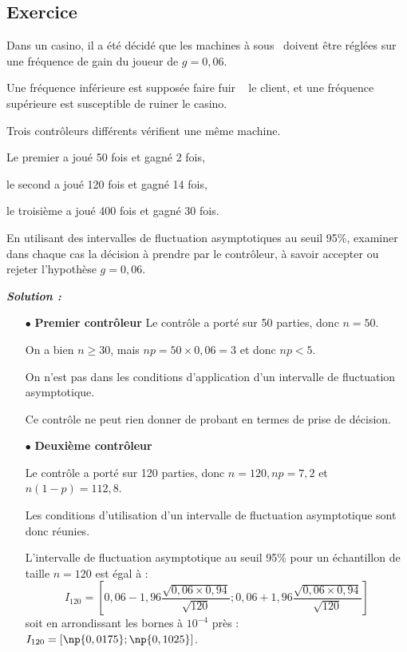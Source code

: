 \documentclass[12pt,french]{article}
\begin{document}
\begin{spacing}{1.2}
\subsection{Exercice}

\begin{defi}

Dans un casino, il a été décidé que les \og machines à sous\fg~ doivent être réglées sur une fréquence de gain du joueur de $g=0,06$.

Une fréquence inférieure est supposée faire \og fuir \fg~ le client, et une fréquence supérieure est susceptible de ruiner le casino.

Trois contrôleurs différents vérifient une même machine.

Le premier a joué 50 fois et gagné 2 fois,

le second a joué 120 fois et gagné 14 fois,

le troisième a joué 400 fois et gagné 30 fois.

En utilisant des intervalles de fluctuation asymptotiques au seuil 95\%, examiner dans chaque cas la décision à prendre par le contrôleur, à savoir accepter ou rejeter l'hypothèse $g=0,06$.
\end{defi}

\bigskip

\textbf{\textit{Solution :}}

\begin{itemize}
\item[$\bullet$] \textbf{Premier contrôleur}
Le contrôle a porté sur 50 parties, donc $n=50$.

On a bien $n\geq 30$, mais $np=50\times 0,06=3$ et donc $np<5$.

On n'est pas dans les conditions d'application d'un intervalle de fluctuation asymptotique.

Ce contrôle ne peut rien donner de probant en termes de prise de décision.

\item[$\bullet$] \textbf{Deuxième contrôleur}

Le contrôle a porté sur 120 parties, donc $n=120, np=7,2$ et $n(1-p)=112,8$.

Les conditions d'utilisation d'un intervalle de fluctuation asymptotique sont donc réunies.

L'intervalle de fluctuation asymptotique au seuil 95\% pour un échantillon de taille $n=120$ est égal à :
\[I_{120}=\left[0,06-1,96\frac{\sqrt{0,06\times 0,94}}{\sqrt{120}};0,06+1,96\frac{\sqrt{0,06\times 0,94}}{\sqrt{120}}\right]\]
soit en arrondissant les bornes à $10^{-4}$ près : $I_{120}=[\np{0,0175};\np{0,1025}]$.


\end{itemize}
\end{spacing}
\end{document}
